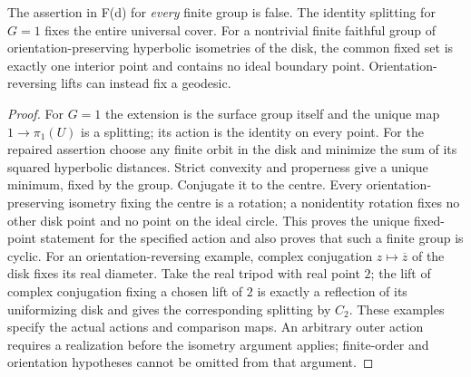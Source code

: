 \begin{proposition}
\label{F-discrete}
The assertion in F(d) for \emph{every} finite group is false. The
identity splitting for $G=1$ fixes the entire universal cover.
For a nontrivial finite faithful group of orientation-preserving
hyperbolic isometries of the disk, the common fixed set is exactly
one interior point and contains no ideal boundary point.
Orientation-reversing lifts can instead fix a geodesic.
\end{proposition}
\begin{proof}
For $G=1$ the extension is the surface group itself and the unique
map $1\to\pi_1(U)$ is a splitting; its action is the identity on
every point. For the repaired assertion choose any finite orbit
in the disk and minimize the sum of its squared hyperbolic
distances. Strict convexity and properness give a unique minimum,
fixed by the group. Conjugate it to the centre. Every
orientation-preserving isometry fixing the centre is a rotation;
a nonidentity rotation fixes no other disk point and no point on
the ideal circle. This proves the unique fixed-point statement
for the specified action and also proves that such a finite group
is cyclic. For an orientation-reversing example, complex
conjugation $z\mapsto\overline z$ of the disk fixes its real
diameter. Take the real tripod with real point $2$; the lift of
complex conjugation fixing a chosen lift of $2$ is exactly a
reflection of its uniformizing disk and gives the corresponding
splitting by $C_2$. These examples specify the actual actions and
comparison maps. An arbitrary outer action requires a realization
before the isometry argument applies; finite-order and
orientation hypotheses cannot be omitted from that argument.
\end{proof}

